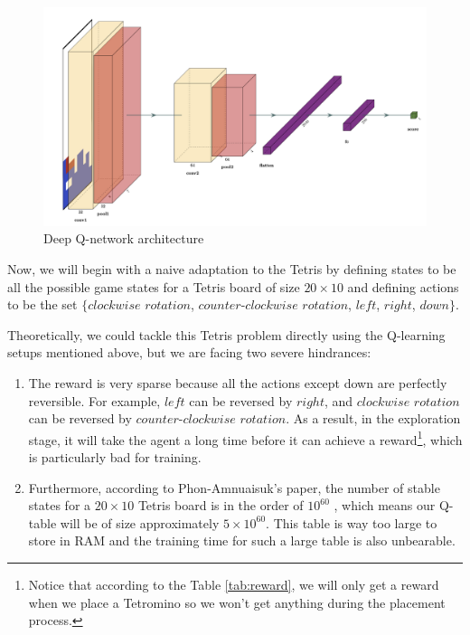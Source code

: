 \documentclass[letterpaper]{article} %
\begin{document}
\begin{figure}[h!]
  \centering
  \includegraphics[width=0.85\linewidth]{figures/DQN.png}
  \caption{Deep Q-network architecture}
  \label{fig:DQN}
\end{figure}

Now, we will begin with a naive adaptation to the Tetris by defining states to be all the possible game states for a Tetris board of size $20\times 10$ and defining actions to be the set $\{clockwise\,\,rotation$, $counter\textit{-}clockwise\,\,rotation$, $left$, $right$, $down\}$.

Theoretically, we could tackle this Tetris problem directly using the Q-learning setups mentioned above, but we are facing two severe hindrances:
\begin{enumerate}
  \item The reward is very sparse because all the actions except down are perfectly reversible. For example, $left$ can be reversed by $right$, and $clockwise\,\,rotation$ can be reversed by $counter\textit{-}clockwise\,\,rotation$. As a result, in the exploration stage, it will take the agent a long time before it can achieve a reward\footnote{Notice that according to the Table \ref{tab:reward}, we will only get a reward when we place a Tetromino so we won't get anything during the placement process.}, which is particularly bad for training. {}
  \item Furthermore, according to Phon-Amnuaisuk's paper, the number of stable states for a $20\times 10$ Tetris board is in the order of $10^{60}$ \cite{somnuk_2015}, which means our Q-table will be of size approximately $5\times 10^{60}$. This table is way too large to store in RAM and the training time for such a large table is also unbearable.
\end{enumerate}
\end{document}
